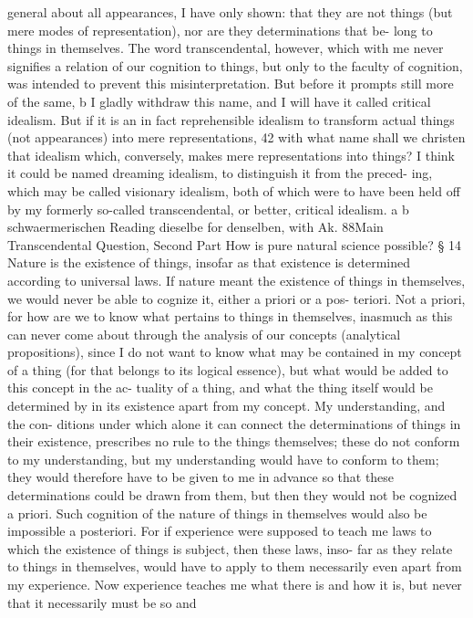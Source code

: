 general about all appearances, I have only shown: that they are not things
(but mere modes of representation), nor are they determinations that be-
long to things in themselves. The word transcendental, however, which
with me never signiﬁes a relation of our cognition to things, but only
to the faculty of cognition, was intended to prevent this misinterpretation.
But before it prompts still more of the same, b I gladly withdraw this
name, and I will have it called critical idealism. But if it is an in fact
reprehensible idealism to transform actual things (not appearances) into
mere representations, 42 with what name shall we christen that idealism
which, conversely, makes mere representations into things? I think it
could be named dreaming idealism, to distinguish it from the preced-
ing, which may be called visionary idealism, both of which were to have
been held off by my formerly so-called transcendental, or better, critical
idealism.
a
b
schwaermerischen
Reading dieselbe for denselben, with Ak.
88Main Transcendental Question,
Second Part
How is pure natural science possible?
§ 14
Nature is the existence of things, insofar as that existence is determined
according to universal laws. If nature meant the existence of things in
themselves, we would never be able to cognize it, either a priori or a pos-
teriori. Not a priori, for how are we to know what pertains to things in
themselves, inasmuch as this can never come about through the analysis
of our concepts (analytical propositions), since I do not want to know
what may be contained in my concept of a thing (for that belongs to
its logical essence), but what would be added to this concept in the ac-
tuality of a thing, and what the thing itself would be determined by in
its existence apart from my concept. My understanding, and the con-
ditions under which alone it can connect the determinations of things
in their existence, prescribes no rule to the things themselves; these do
not conform to my understanding, but my understanding would have to
conform to them; they would therefore have to be given to me in advance
so that these determinations could be drawn from them, but then they
would not be cognized a priori.
Such cognition of the nature of things in themselves would also be
impossible a posteriori. For if experience were supposed to teach me
laws to which the existence of things is subject, then these laws, inso-
far as they relate to things in themselves, would have to apply to them
necessarily even apart from my experience. Now experience teaches me
what there is and how it is, but never that it necessarily must be so and
